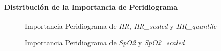 \paragraph{Distribución de la Importancia de Peridiograma}

\begin{figure}[H]
    \centering
    \caption{Importancia Peridiograma de \textit{HR}, \textit{HR\_scaled} y \textit{HR\_quantile}}\label{fig:per_imp_fc}
\end{figure}

\begin{figure}[ht]
    \centering
    \hfill
    \caption{Importancia Peridiograma de \textit{SpO2} y \textit{SpO2\_scaled}}\label{fig:per_imp_spo2}
\end{figure}


